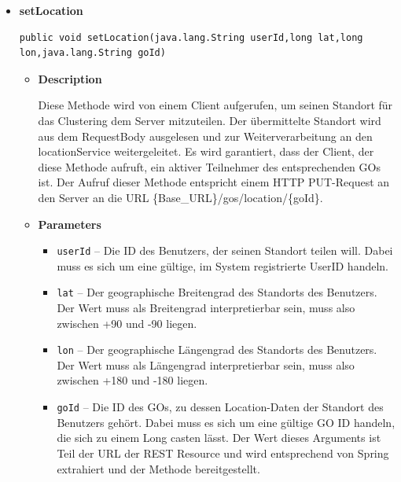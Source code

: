 \documentclass[11pt,a4paper]{article}
\begin{document}
{{{{{{{{{{{{{{{{{{\begin{itemize}
{\begin{itemize}
{}%
\end{itemize}
}%
\item{ 
\hypertarget{edu.kit.pse17.go_app.ClientCommunication.Upstream.GoRestController.setLocation(java.lang.String, long, long, java.lang.String)}{{\bf  setLocation}\\}
\begin{lstlisting}[frame=none]
public void setLocation(java.lang.String userId,long lat,long lon,java.lang.String goId)\end{lstlisting} %
\begin{itemize}
\item{
{\bf  Description}

Diese Methode wird von einem Client aufgerufen, um seinen Standort für das Clustering dem Server mitzuteilen. Der übermittelte Standort wird aus dem RequestBody ausgelesen und zur Weiterverarbeitung an den locationService weitergeleitet. Es wird garantiert, dass der Client, der diese Methode aufruft, ein aktiver Teilnehmer des entsprechenden GOs ist. Der Aufruf dieser Methode entspricht einem HTTP PUT-Request an den Server an die URL \{Base\_URL\}/gos/location/\{goId\}.
}
\item{
{\bf  Parameters}
  \begin{itemize}
   \item{
\texttt{userId} -- Die ID des Benutzers, der seinen Standort teilen will. Dabei muss es sich um eine gültige, im System registrierte UserID handeln.}
   \item{
\texttt{lat} -- Der geographische Breitengrad des Standorts des Benutzers. Der Wert muss als Breitengrad interpretierbar sein, muss also zwischen +90 und -90 liegen.}
   \item{
\texttt{lon} -- Der geographische Längengrad des Standorts des Benutzers. Der Wert muss als Längengrad interpretierbar sein, muss also zwischen +180 und -180 liegen.}
   \item{
\texttt{goId} -- Die ID des GOs, zu dessen Location-Daten der Standort des Benutzers gehört. Dabei muss es sich um eine gültige GO ID handeln, die sich zu einem Long casten lässt. Der Wert dieses Arguments ist Teil der URL der REST Resource und wird entsprechend von Spring extrahiert und der Methode bereitgestellt.}
  \end{itemize}
}%
\end{itemize}
}%
\end{itemize}
}
}
}}}}}}}}}}}}}}}}
\end{document}
